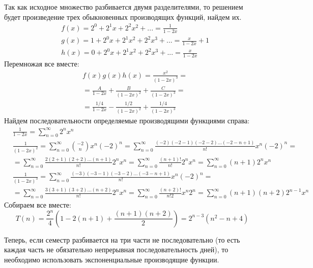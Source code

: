 \documentclass[a4paper,12pt]{article}
\begin{document}
\begin{Solution}
Так как исходное множество разбивается двумя разделителями, то решением будет произведение трех обыкновенных производящих функций, найдем их.
\[
	\begin{split}
		& f\left(x\right) = 2^0 + 2^1 x + 2^2 x^2 + ... = \frac{1}{1 - 2 x} \\
		& g\left(x\right) = 1 + 2^0 x + 2^1 x^2 + 2^2 x^3 + ... = \frac{x}{1 - 2 x} + 1 \\
		& h\left(x\right) = 0 + 2^0 x + 2^1 x^2 + 2^2 x^3 + ... = \frac{x}{1 - 2 x}
	\end{split}
\]
Перемножая все вместе:
\[
	\begin{split}
		& f\left(x\right) g\left(x\right) h\left(x\right) = \frac{x^2}{\left(1 - 2 x\right)^3} = \\
		& = \frac{A}{1 - 2 x} + \frac{B}{\left(1 - 2 x\right)^2} + \frac{C}{\left(1 - 2 x\right)^3} = \\
		& = \frac{1/4}{1 - 2 x} - \frac{1/2}{\left(1 - 2 x\right)^2} + \frac{1/4}{\left(1 - 2 x\right)^3}
	\end{split}
\]
Найдем последовательности определяемые производящими функциями справа:
\[
	\begin{split}
		& \frac{1}{1 - 2 x} = \sum_{n=0}^{\infty} 2^n x^n \\
		& \frac{1}{\left(1 - 2 x\right)^2} = \sum_{n=0}^{\infty} \binom{-2}{n} x^n \left(-2\right)^n = \sum_{n=0}^{\infty} \frac{\left(-2\right)\left(-2 - 1\right)\left(-2-2\right) ... \left(-2 - n + 1\right)}{n!} x^n \left(-2\right)^n = \\
		& = \sum_{n=0}^{\infty} \frac{2\left(2+1\right)\left(2+2\right) ... \left(n+1\right)}{n!} 2^n x^n = \sum_{n=0}^{\infty} \frac{\left(n+1\right)!}{n!} 2^n x^n = \sum_{n=0}^{\infty} \left(n+1\right) 2^n x^n \\
		& \frac{1}{\left(1 - 2 x\right)^3} = \sum_{n=0}^{\infty} \frac{\left(-3\right)\left(-3-1\right)\left(-3-2\right) ... \left(-3-n+1\right)}{n!} x^n \left(-2\right)^n = \\
		& = \sum_{n=0}^{\infty} \frac{3\left(3+1\right)\left(3+2\right) ... \left(n+2\right)}{n!} 2^n x^n = \sum_{n=0}^{\infty} \frac{\left(n+2\right)!}{n! 2} x^n 2^n = \sum_{n=0}^{\infty} \left(n+1\right)\left(n+2\right) 2^{n-1} x^n
	\end{split}
\]
Собираем все вместе:
\[
	T\left(n\right) = \frac{2^n}{4} \left(1 - 2 \left(n+1\right) + \frac{\left(n+1\right)\left(n+2\right)}{2}\right) = 2^{n-3} \left(n^2 - n + 4\right)
\]

Теперь, если семестр разбивается на три части не последовательно (то есть каждая часть не  обязательно непрерывная последовательность дней), то необходимо использовать экспоненциальные производящие функции.


\end{Solution}
\end{document}
